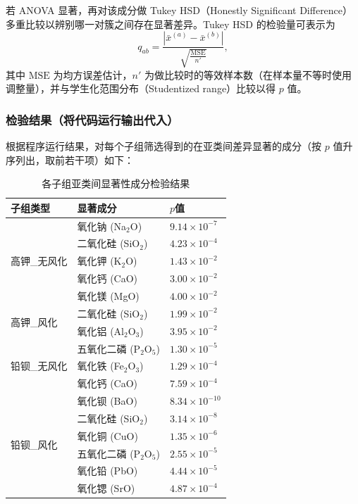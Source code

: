 \documentclass[withoutpreface,bwprint]{cumcmthesis}
\begin{document}
若 ANOVA 显著，再对该成分做 Tukey HSD（Honestly Significant Difference）多重比较以辨别哪一对簇之间存在显著差异。Tukey HSD 的检验量可表示为
\[
q_{ab}=\frac{|\bar{x}^{(a)}-\bar{x}^{(b)}|}{\sqrt{\tfrac{\mathrm{MSE}}{n'}}},
\]
其中 $\mathrm{MSE}$ 为均方误差估计，$n'$ 为做比较时的等效样本数（在样本量不等时使用调整量），并与学生化范围分布（Studentized range）比较以得 $p$ 值。

\subsubsection{检验结果（将代码运行输出代入）}
根据程序运行结果，对每个子组筛选得到的在亚类间差异显著的成分（按 $p$ 值升序列出，取前若干项）如下：

\begin{table}[htbp]
    \centering
    \caption{各子组亚类间显著性成分检验结果}
    \label{tab:significance_test}
    \begin{tabular}{lll}
        \toprule
        子组类型 & 显著成分 & $p$值 \\
        \midrule
        \multirow{5}{*}{高钾\_无风化} 
        & 氧化钠 (Na$_2$O) & $9.14 \times 10^{-7}$ \\
        & 二氧化硅 (SiO$_2$) & $4.23 \times 10^{-4}$ \\
        & 氧化钾 (K$_2$O) & $1.43 \times 10^{-2}$ \\
        & 氧化钙 (CaO) & $3.00 \times 10^{-2}$ \\
        & 氧化镁 (MgO) & $4.00 \times 10^{-2}$ \\
        \midrule
        \multirow{2}{*}{高钾\_风化} 
        & 二氧化硅 (SiO$_2$) & $1.99 \times 10^{-2}$ \\
        & 氧化铝 (Al$_2$O$_3$) & $3.95 \times 10^{-2}$ \\
        \midrule
        \multirow{3}{*}{铅钡\_无风化} 
        & 五氧化二磷 (P$_2$O$_5$) & $1.30 \times 10^{-5}$ \\
        & 氧化铁 (Fe$_2$O$_3$) & $1.29 \times 10^{-4}$ \\
        & 氧化钙 (CaO) & $7.59 \times 10^{-4}$ \\
        \midrule
        \multirow{6}{*}{铅钡\_风化} 
        & 氧化钡 (BaO) & $8.34 \times 10^{-10}$ \\
        & 二氧化硅 (SiO$_2$) & $3.14 \times 10^{-8}$ \\
        & 氧化铜 (CuO) & $1.35 \times 10^{-6}$ \\
        & 五氧化二磷 (P$_2$O$_5$) & $2.55 \times 10^{-5}$ \\
        & 氧化铅 (PbO) & $4.44 \times 10^{-5}$ \\
        & 氧化锶 (SrO) & $4.87 \times 10^{-4}$ \\
        \bottomrule
    \end{tabular}
\end{table}
\end{document}
